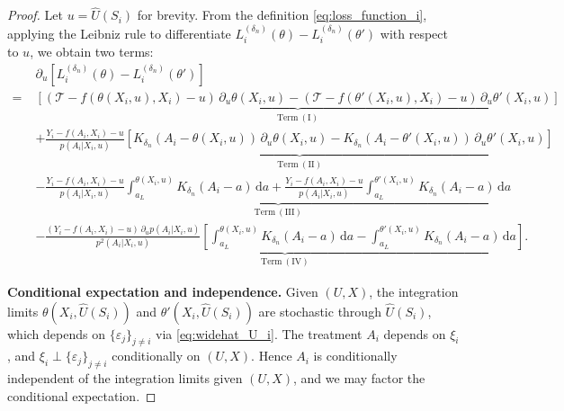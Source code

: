 \documentclass[12pt]{article}
\begin{document}
\begin{proof}
Let $u = \widehat{U}(S_i)$ for brevity. From the definition \eqref{eq:loss_function_i}, applying the Leibniz rule to differentiate $L^{(\delta_n)}_i(\theta) - L^{(\delta_n)}_i(\theta')$ with respect to $u$, we obtain two terms:
\begin{align*}
&\partial_u\!\left[L^{(\delta_n)}_i(\theta) - L^{(\delta_n)}_i(\theta')\right]\\
=\;&\underbrace{\left[(\mathcal{T}-f(\theta(X_i,u),X_i)-u)\,\partial_u\theta(X_i,u) - (\mathcal{T}-f(\theta'(X_i,u),X_i)-u)\,\partial_u\theta'(X_i,u)\right]}_{\mathrm{Term\ (I)}}\\
&+\underbrace{\frac{Y_i - f(A_i,X_i)-u}{p(A_i|X_i,u)}\left[K_{\delta_n}(A_i-\theta(X_i,u))\,\partial_u\theta(X_i,u) - K_{\delta_n}(A_i-\theta'(X_i,u))\,\partial_u\theta'(X_i,u)\right]}_{\mathrm{Term\ (II)}}\\
&-\underbrace{\frac{Y_i - f(A_i,X_i)-u}{p(A_i|X_i,u)}\int_{a_L}^{\theta(X_i,u)}K_{\delta_n}(A_i-a)\,\mathrm{d}a + \frac{Y_i-f(A_i,X_i)-u}{p(A_i|X_i,u)}\int_{a_L}^{\theta'(X_i,u)}K_{\delta_n}(A_i-a)\,\mathrm{d}a}_{\mathrm{Term\ (III)}}\\
&-\underbrace{\frac{(Y_i-f(A_i,X_i)-u)\,\partial_u p(A_i|X_i,u)}{p^2(A_i|X_i,u)}\left[\int_{a_L}^{\theta(X_i,u)}K_{\delta_n}(A_i-a)\,\mathrm{d}a - \int_{a_L}^{\theta'(X_i,u)}K_{\delta_n}(A_i-a)\,\mathrm{d}a\right]}_{\mathrm{Term\ (IV)}}.
\end{align*}

\noindent\textbf{Conditional expectation and independence.}
Given $(U,X)$, the integration limits $\theta(X_i,\widehat{U}(S_i))$ and $\theta'(X_i,\widehat{U}(S_i))$ are stochastic through $\widehat{U}(S_i)$, which depends on $\{\varepsilon_j\}_{j\neq i}$ via \eqref{eq:widehat_U_i}. The treatment $A_i$ depends on $\xi_i$, and $\xi_i \perp \{\varepsilon_j\}_{j\neq i}$ conditionally on $(U,X)$. Hence $A_i$ is conditionally independent of the integration limits given $(U,X)$, and we may factor the conditional expectation.


\end{proof}
\end{document}
